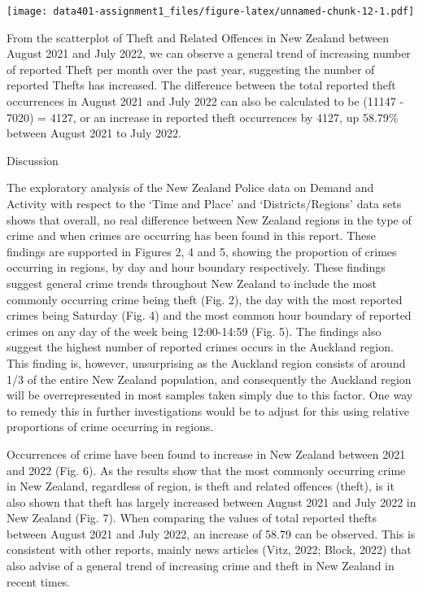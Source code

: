 \documentclass[
  10pt,
]{article}
\begin{document}
\texttt{[image: data401-assignment1\_files/figure-latex/unnamed-chunk-12-1.pdf]}

From the scatterplot of Theft and Related Offences in New Zealand
between August 2021 and July 2022, we can observe a general trend of
increasing number of reported Theft per month over the past year,
suggesting the number of reported Thefts has increased. The difference
between the total reported theft occurrences in August 2021 and July
2022 can also be calculated to be (11147 - 7020) = 4127, or an increase
in reported theft occurrences by 4127, up 58.79\% between August 2021 to
July 2022.

Discussion

The exploratory analysis of the New Zealand Police data on Demand and
Activity with respect to the `Time and Place' and `Districts/Regions'
data sets shows that overall, no real difference between New Zealand
regions in the type of crime and when crimes are occurring has been
found in this report. These findings are supported in Figures 2, 4 and
5, showing the proportion of crimes occurring in regions, by day and
hour boundary respectively. These findings suggest general crime trends
throughout New Zealand to include the most commonly occurring crime
being theft (Fig. 2), the day with the most reported crimes being
Saturday (Fig. 4) and the most common hour boundary of reported crimes
on any day of the week being 12:00-14:59 (Fig. 5). The findings also
suggest the highest number of reported crimes occurs in the Auckland
region. This finding is, however, unsurprising as the Auckland region
consists of around 1/3 of the entire New Zealand population, and
consequently the Auckland region will be overrepresented in most samples
taken simply due to this factor. One way to remedy this in further
investigations would be to adjust for this using relative proportions of
crime occurring in regions.

Occurrences of crime have been found to increase in New Zealand between
2021 and 2022 (Fig. 6). As the results show that the most commonly
occurring crime in New Zealand, regardless of region, is theft and
related offences (theft), is it also shown that theft has largely
increased between August 2021 and July 2022 in New Zealand (Fig. 7).
When comparing the values of total reported thefts between August 2021
and July 2022, an increase of 58.79 can be observed. This is consistent
with other reports, mainly news articles (Vitz, 2022; Block, 2022) that
also advise of a general trend of increasing crime and theft in New
Zealand in recent times.
\end{document}
